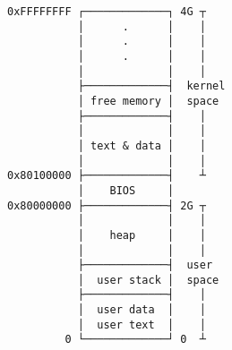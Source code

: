 \documentclass[varwidth,crop]{standalone}
\begin{document}
\begin{verbatim}
0xFFFFFFFF ┌─────────────┐ 4G ┬
           │      .      │    │
           │      .      │    │
           │      .      │    │
           │             │    │
           ├─────────────┤  kernel
           │ free memory │  space
           ├─────────────┤    │
           │             │    │
           │ text & data │    │
           │             │    │
0x80100000 ├─────────────┤    ┴
           │    BIOS     │
0x80000000 ├─────────────┤ 2G ┬
           │             │    │
           │    heap     │    │
           │             │    │
           ├─────────────┤  user
           │  user stack │  space
           ├─────────────┤    │
           │  user data  │    │
           │  user text  │    │
         0 └─────────────┘ 0  ┴
\end{verbatim}
\end{document}
